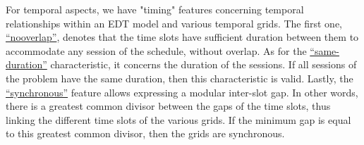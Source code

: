For temporal aspects, we have "timing" features concerning temporal relationships within an EDT model and various temporal grids.
%
%
The first one, \hyperref[featmodel:nooverlap]{``nooverlap''}, denotes that the time slots have sufficient duration between them to accommodate any session of the schedule, without overlap. 
%
As for the \hyperref[featmodel:sameduration]{``same-duration''} characteristic, it concerns the duration of the sessions. If all sessions of the problem have the same duration, then this characteristic is valid. 
%
Lastly, the \hyperref[featmodel:synchronous]{``synchronous''} feature allows expressing a modular inter-slot gap. In other words, there is a greatest common divisor between the gaps of the time slots, thus linking the different time slots of the various grids. If the minimum gap is equal to this greatest common divisor, then the grids are synchronous.

